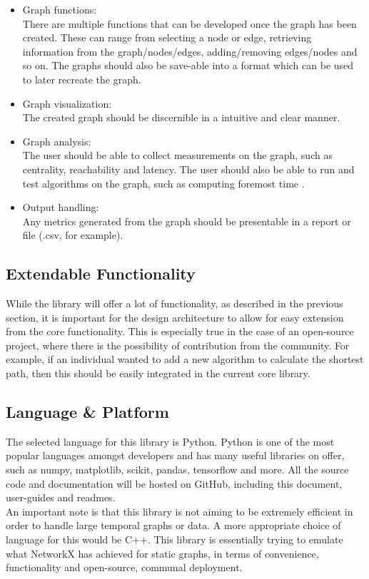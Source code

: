 \begin{specification}
\begin{itemize}
    \item Graph functions:\\
    There are multiple functions that can be developed once the graph has been created. These can range from selecting a node or edge, retrieving information from the graph/nodes/edges, adding/removing edges/nodes and so on. The graphs should also be save-able into a format which can be used to later recreate the graph. 
    \item Graph visualization:\\
    The created graph should be discernible in a intuitive and clear manner.
    \item Graph analysis:\\
    The user should be able to collect measurements on the graph, such as centrality, reachability and latency. The user should also be able to run and test algorithms on the graph, such as computing foremost time \cite{efficient_algorithms}.
    \item Output handling:\\
    Any metrics generated from the graph should be presentable in a report or file (.csv, for example).
\end{itemize}
\clearpage
\subsection{Extendable Functionality}
While the library will offer a lot of functionality, as described in the previous section, it is important for the design architecture to allow for easy extension from the core functionality. This is especially true in the case of an open-source project, where there is the possibility of contribution from the community. For example, if an individual wanted to add a new algorithm to calculate the shortest path, then this should be easily integrated in the current core library.
\subsection{Language \& Platform}
The selected language for this library is Python. Python is one of the most popular languages amongst developers and has many useful libraries on offer, such as numpy, matplotlib, scikit, pandas, tensorflow and more. All the source code and documentation will be hosted on GitHub, including this document, user-guides and readmes.\\
An important note is that this library is not aiming to be extremely efficient in order to handle large temporal graphs or data. A more appropriate choice of language for this would be C++. This library is essentially trying to emulate what NetworkX \cite{NetworkX} has achieved for static graphs, in terms of convenience, functionality and open-source, communal deployment.

\end{specification}
